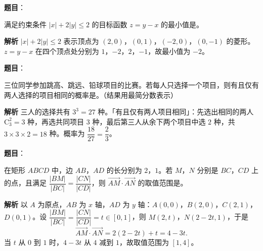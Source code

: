 \begin{answer}

\textbf{题目}：

满足约束条件 $|x|+2|y|\leqslant2$ 的目标函数 $z=y-x$ 的最小值是\gkblank{}。

\textbf{解析}
$|x|+2|y|\leqslant2$ 表示顶点为 $(2,0)$，$(0,1)$，$(-2,0)$，$(0,-1)$ 的菱形。$z=y-x$ 在四个顶点处分别为 $1$，$-2$，$2$，$-1$，故最小值为 $-2$。


\end{answer}
\begin{answer}

\textbf{题目}：

三位同学参加跳高、跳远、铅球项目的比赛。若每人只选择一个项目，则有且仅有两人选择的项目相同的概率是\gkblank{}。（结果用最简分数表示）

\textbf{解析}
三人的选择共有 $3^3=27$ 种。「有且仅有两人项目相同」：先选出相同的两人 $\mathrm C_3^2=3$ 种，再选共同项目 $3$ 种，最后第三人从余下两个项目中选 $2$ 种，共 $3\times3\times2=18$ 种。概率为 $\dfrac{18}{27}=\dfrac23$。


\end{answer}
\begin{answer}

\textbf{题目}：

在矩形 $ABCD$ 中，边 $AB$，$AD$ 的长分别为 $2$，$1$。若 $M$，$N$ 分别是 $BC$，$CD$ 上的点，且满足 $\dfrac{|BM|}{|BC|}=\dfrac{|CN|}{|CD|}$，则 $\overrightarrow{AM}\cdot\overrightarrow{AN}$ 的取值范围是\gkblank{}。

\textbf{解析}
以 $A$ 为原点，$AB$ 为 $x$ 轴，$AD$ 为 $y$ 轴：$A(0,0)$，$B(2,0)$，$C(2,1)$，$D(0,1)$。设 $\dfrac{|BM|}{|BC|}=\dfrac{|CN|}{|CD|}=t\in[0,1]$，则 $M(2,t)$，$N(2-2t,1)$，于是
\nopagebreak[4]
\[\overrightarrow{AM}\cdot\overrightarrow{AN}=2(2-2t)+t=4-3t.\]
当 $t$ 从 $0$ 到 $1$ 时，$4-3t$ 从 $4$ 减到 $1$，故取值范围为 $[1,4]$。


\end{answer}
